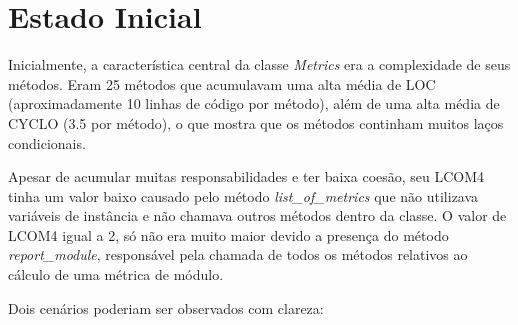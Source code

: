 \section{Estado Inicial}
Inicialmente, a característica central da classe \textit{Metrics} era a complexidade de seus métodos.
Eram 25 métodos que acumulavam uma alta média de LOC (aproximadamente 10 linhas de código por método),
além de uma alta média de CYCLO (3.5 por método), o que mostra que os métodos continham muitos laços condicionais.

Apesar de acumular muitas responsabilidades e ter baixa coesão, seu LCOM4 tinha um valor baixo
causado pelo método \textit{list\_of\_metrics} que não utilizava variáveis de instância e não chamava
outros métodos dentro da classe. O valor de LCOM4 igual a 2, só não era muito maior devido a presença
do método \textit{report\_module}, responsável pela chamada de todos os métodos relativos ao cálculo de
uma métrica de módulo.

Dois cenários poderiam ser observados com clareza:

